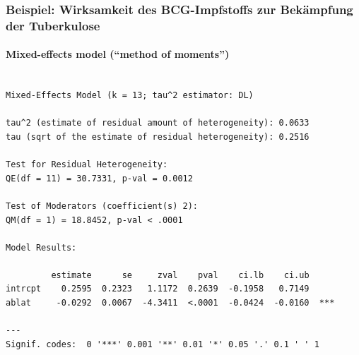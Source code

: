 \begin{frame}[fragile]
  \frametitle{Beispiel: Wirksamkeit des BCG-Impfstoffs zur Bekämpfung der Tuberkulose}
  \framesubtitle{Mixed-effects model ("`method of moments"')}

\begin{tiny}
\begin{knitrout}
\color{fgcolor}\begin{kframe}
\begin{verbatim}

Mixed-Effects Model (k = 13; tau^2 estimator: DL)

tau^2 (estimate of residual amount of heterogeneity): 0.0633
tau (sqrt of the estimate of residual heterogeneity): 0.2516

Test for Residual Heterogeneity: 
QE(df = 11) = 30.7331, p-val = 0.0012

Test of Moderators (coefficient(s) 2): 
QM(df = 1) = 18.8452, p-val < .0001

Model Results:

         estimate      se     zval    pval    ci.lb    ci.ub     
intrcpt    0.2595  0.2323   1.1172  0.2639  -0.1958   0.7149     
ablat     -0.0292  0.0067  -4.3411  <.0001  -0.0424  -0.0160  ***

---
Signif. codes:  0 '***' 0.001 '**' 0.01 '*' 0.05 '.' 0.1 ' ' 1 
\end{verbatim}
\end{kframe}
\end{knitrout}

\end{tiny}
\end{frame}


